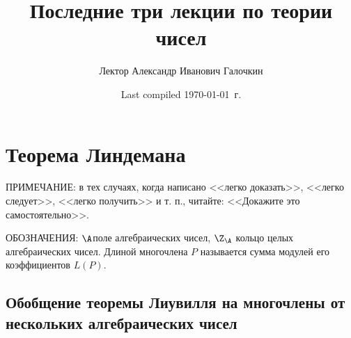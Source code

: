 \documentclass{article}
\title{Последние три лекции по теории чисел}
\author{Лектор Александр Иванович Галочкин}
\date{Last compiled \today~г.}
\begin{document}
\maketitle

\section{Теорема Линдемана}

ПРИМЕЧАНИЕ: в тех случаях, когда написано <<легко доказать>>, <<легко следует>>,
<<легко получить>> и т. п., читайте: <<Докажите это самостоятельно>>.

ОБОЗНАЧЕНИЯ: $\A$\т поле алгебраических чисел, $\Z_\A$ кольцо целых алгебраических чисел.
Длиной многочлена $P$ называется сумма модулей его коэффициентов $L(P)$.

\subsection{Обобщение теоремы Лиувилля на многочлены от нескольких алгебраических чисел}
\end{document}
